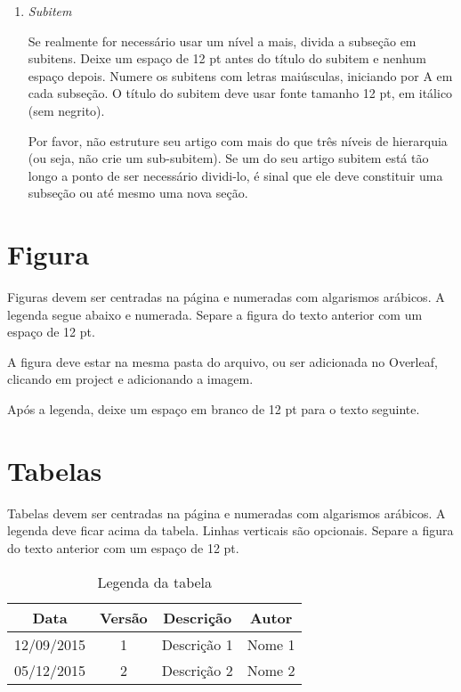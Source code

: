 \documentclass[
	article,			%
	12pt,				%
	oneside,			%
	a4paper,			%
	english,			%
	brazil,				%
	sumario=tradicional
	]{abntex2}
\begin{document}
\begin{enumerate}[label=\Alph*]
\item \textit{Subitem}

Se realmente for necessário usar um nível a mais, divida a subseção em subitens.  Deixe um espaço de 12 pt antes do título do subitem e nenhum espaço depois.  Numere os subitens com letras maiúsculas, iniciando por A em cada subseção.   O título do subitem deve usar fonte tamanho 12 pt, em itálico (sem negrito).

Por favor, não estruture seu artigo com mais do que três níveis de hierarquia (ou seja, não crie um sub-subitem).  Se um do seu artigo subitem está tão longo a ponto de ser necessário dividi-lo, é sinal que ele deve constituir uma subseção ou até mesmo uma nova seção.

\end{enumerate}

\section{Figura}

Figuras devem ser centradas na página e numeradas com algarismos arábicos.  A legenda segue abaixo e numerada. Separe a figura do texto anterior com um espaço de 12 pt. 

A figura deve estar na mesma pasta do arquivo, ou ser adicionada no Overleaf, clicando em project e adicionando a imagem.


Após a legenda, deixe um espaço em branco de 12 pt para o texto seguinte.

\section{Tabelas}

Tabelas devem ser centradas na página e numeradas com algarismos arábicos.  A legenda deve ficar acima da tabela.   Linhas verticais são opcionais.  Separe a figura do texto anterior com um espaço de 12 pt. 

\begin{table}[H]     %
\centering
\caption{Legenda da tabela}
\label{my-label}

\begin{tabular}{c|c|c|c}
Data       & Versão & Descrição   & Autor  \\ \hline
12/09/2015 & 1      & Descrição 1 & Nome 1 \\
05/12/2015 & 2      & Descrição 2 & Nome 2
\end{tabular}
\end{table}
\end{document}
